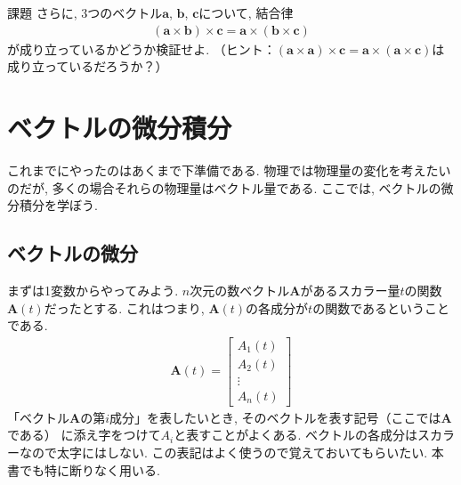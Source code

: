 \begin{itembox}[l]{課題}
さらに, 3つのベクトル$\bm{a}$, $\bm{b}$, $\bm{c}$について, 結合律
\begin{eqnarray}
( \bm{a} \times \bm{b} ) \times \bm{c} =\bm{a} \times ( \bm{b} \times \bm{c} )
\end{eqnarray}
が成り立っているかどうか検証せよ. 
（ヒント：$( \bm{a} \times \bm{a} ) \times \bm{c} =\bm{a} \times ( \bm{a} \times \bm{c} )$は成り立っているだろうか？）
\end{itembox}
\section{ベクトルの微分積分}
これまでにやったのはあくまで下準備である. 物理では物理量の変化を考えたいのだが, 多くの場合それらの物理量はベクトル量である. 
ここでは, ベクトルの微分積分を学ぼう. 

\subsection{ベクトルの微分}
まずは1変数からやってみよう. $n$次元の数ベクトル$\bm{A}$があるスカラー量$t$の関数$\bm{A}(t)$だったとする. 
これはつまり, $\bm{A}(t)$の各成分が$t$の関数であるということである. 
\begin{eqnarray}
\bm{A}(t) = \left[
\begin{array}{c}
 A_1 (t) \\
 A_2 (t) \\
 \vdots \\
 A_n (t)
 \end{array}
\right]
\label{eq:vect}
\end{eqnarray}
「ベクトル$\bm{A}$の第$i$成分」を表したいとき, そのベクトルを表す記号（ここでは$\bm{A}$である）
に添え字をつけて$A_i$と表すことがよくある. 
ベクトルの各成分はスカラーなので太字にはしない. この表記はよく使うので覚えておいてもらいたい. 
本書でも特に断りなく用いる. 

